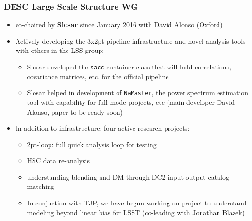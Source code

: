 \documentclass[aspectratio=169]{beamer}
\begin{document}
\begin{frame}
\frametitle {DESC Large Scale Structure WG}

\begin{itemize}  
\item co-chaired by \textbf{Slosar} since January 2016 with David
  Alonso (Oxford)

\item Actively developing the 3x2pt pipeline infrastructure and
  novel analysis tools with others in the LSS group:
  \begin{itemize}
  \item Slosar developed the \texttt{sacc} container class that will
    hold correlations, covariance matrices, etc. for the official
    pipeline

  \item Slosar helped in development of \texttt{NaMaster}, the power
    spectrum estimation tool with capability for full mode projects,
    etc (main developer David Alonso, paper to be ready soon)
  \end{itemize}

\item In addition to infrastructure: four active research projects:

  \begin{itemize}
  \item 2pt-loop: full quick analysis loop for testing
  \item HSC data re-analysis
  \item understanding blending and DM through DC2 input-output catalog
    matching

  \item In conjuction with TJP, we have begun working on project to
  understand modeling beyond linear bias for LSST (co-leading with
  Jonathan Blazek)

  \end{itemize}






\end{itemize}
\end{frame}
\end{document}
